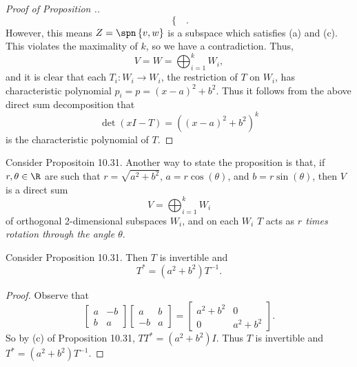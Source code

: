 \documentclass[linearalgebra]{subfiles}
\begin{document}
\begin{proof}[Proof of Proposition \thechapter.\thestcounter]
\begin{equation*}
\begin{cases}
            \end{cases}.
        \end{equation*}
        However, this means $Z = \spn\left\lbrace v,w \right\rbrace$ is a subspace which satisfies (a) and (c). This violates the maximality of $k$, so we have a contradiction. Thus,
        \begin{equation*}
            V = W = \bigoplus^{k}_{i=1} W_i,
        \end{equation*}
        and it is clear that each $T_i:W_i\to W_i$, the restriction of $T$ on $W_i$, has characteristic polynomial $p_i = p = \left( x-a \right) ^{2} + b^{2}$. Thus it follows from the above direct sum decomposition that
        \begin{equation*}
            \det\left( xI-T \right) = \left( \left( x-a \right) ^{2} +b^{2}  \right) ^k
        \end{equation*}
        is the characteristic polynomial of $T$.
    \end{proof}

    \begin{remark}
        Consider Propositoin 10.31. Another way to state the proposition is that, if $r,\theta\in\R$ are such that $r=\sqrt{a^{2} +b^{2} }$, $a=r\cos(\theta)$, and $b=r\sin(\theta)$, then $V$ is a direct sum
        \begin{equation*}
            V = \bigoplus^{k}_{i=1} W_i
        \end{equation*}
        of orthogonal 2-dimensional subspaces $W_i$, and on each $W_i$ $T$ acts as \textit{$r$ times rotation through the angle $\theta$}.
    \end{remark}

    \begin{cor}{}
        Consider Proposition 10.31. Then $T$ is invertible and
        \begin{equation*}
            T^{*} = \left( a^{2} + b^{2}  \right) T^{-1} .
        \end{equation*}
    \end{cor}	

    \begin{proof}
        Observe that
        \begin{equation*}
            \begin{bmatrix}
                a & -b \\ b & a
            \end{bmatrix}
            \begin{bmatrix}
                a & b \\ -b & a
            \end{bmatrix}
            =
            \begin{bmatrix}
                a^{2} + b^{2} & 0 \\ 0 & a^{2} + b^{2} 
            \end{bmatrix}.
        \end{equation*}
        So by (c) of Proposition 10.31, $TT^{*} = \left( a^{2} + b^{2}  \right) I$. Thus $T$ is invertible and $T^{*} =\left( a^{2} +b^{2}  \right)T^{-1}$.
    \end{proof}
\end{document}
